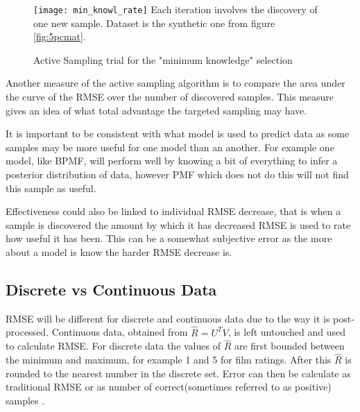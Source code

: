 \begin{figure}[!htbp]
  \begin{center}
    \texttt{[image: min\_knowl\_rate]}
    Each iteration involves the discovery of one new sample. Dataset is the synthetic one from figure \ref{fig:5pcmat}.
    \caption{Active Sampling trial for the "minimum knowledge" selection}
    \label{fig:al_minknowl}
  \end{center}
\end{figure}

Another measure of the active sampling algorithm is to compare the area under the curve of the RMSE over the number of discovered samples. This measure gives an idea of what total advantage the targeted sampling may have.



It is important to be consistent with what model is used to predict data as some samples may be more useful for one model than an another. For example one model, like BPMF, will perform well by knowing a bit of everything to infer a posterior distribution of data, however PMF which does not do this will not find this sample as useful.

Effectiveness could also be linked to individual RMSE decrease, that is when a sample is discovered the amount by which it has decreased RMSE is used to rate how useful it has been. This can be a somewhat subjective error as the more about a model is know the harder RMSE decrease is.

\subsection{Discrete vs Continuous Data}
RMSE will be different for discrete and continuous data due to the way it is post-processed. Continuous data, obtained from $\hat{R}=U^TV$, is left untouched and used to calculate RMSE. For discrete data the values of $\hat{R}$ are first bounded between the minimum and maximum, for example 1 and 5 for film ratings. After this $\hat{R}$ is rounded to the nearest number in the discrete set. Error can then be calculate as traditional RMSE or as number of correct(sometimes referred to as positive) samples \cite{recsyshand}.
